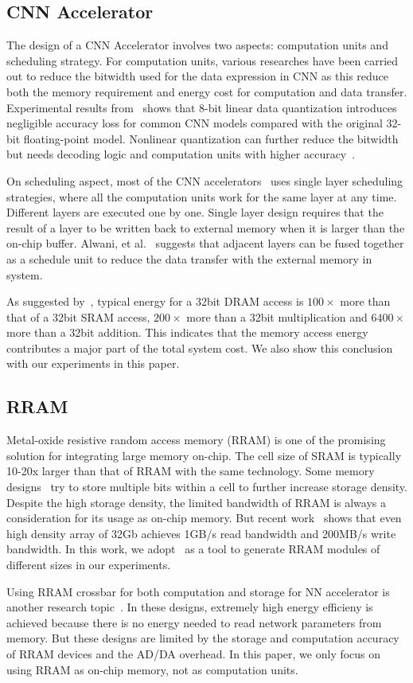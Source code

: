 \subsection{CNN Accelerator}
The design of a CNN Accelerator involves two aspects: computation units and scheduling strategy. For computation units, various researches have been carried out to reduce the bitwidth used for the data expression in CNN as this reduce both the memory requirement and energy cost for computation and data transfer. Experimental results from~\cite{guo2017software} shows that 8-bit linear data quantization introduces negligible accuracy loss for common CNN models compared with the original 32-bit floating-point model. Nonlinear quantization can further reduce the bitwidth~\cite{han2015deep} but needs decoding logic and computation units with higher accuracy~\cite{eie}.

On scheduling aspect, most of the CNN accelerators~\cite{zhang2015optimizing}\cite{qiu2016going}\cite{ma2017optimizing} uses single layer scheduling strategies, where all the computation units work for the same layer at any time. Different layers are executed one by one. Single layer design requires that the result of a layer to be written back to external memory when it is larger than the on-chip buffer. Alwani, et al.~\cite{alwani2016fused} suggests that adjacent layers can be fused together as a schedule unit to reduce the data transfer with the external memory in system.

As suggested by~\cite{mac_energy}, typical energy for a 32bit DRAM access is $100\times$ more than that of a 32bit SRAM access, $200\times$ more than a 32bit multiplication and $6400\times$ more than a 32bit addition. This indicates that the memory access energy contributes a major part of the total system cost. We also show this conclusion with our experiments in this paper.

\subsection{RRAM}
Metal-oxide resistive random access memory (RRAM) is one of the promising solution for integrating large memory on-chip. The cell size of SRAM is typically 10-20x larger than that of RRAM with the same technology. Some memory designs~\cite{chien2009multi}\cite{chien2011multi} try to store multiple bits within a cell to further increase storage density. Despite the high storage density, the limited bandwidth of RRAM is always a consideration for its usage as on-chip memory. But recent work~\cite{fackenthal201419} shows that even high density array of 32Gb achieves 1GB/s read bandwidth and 200MB/s write bandwidth. In this work, we adopt~\cite{dong2014nvsim} as a tool to generate RRAM modules of different sizes in our experiments.

Using RRAM crossbar for both computation and storage for NN accelerator is another research topic~\cite{chi2016prime}\cite{cheng2017time}\cite{xia2016switched}. In these designs, extremely high energy efficieny is achieved because there is no energy needed to read network parameters from memory. But these designs are limited by the storage and computation accuracy of RRAM devices and the AD/DA overhead. In this paper, we only focus on using RRAM as on-chip memory, not as computation units.